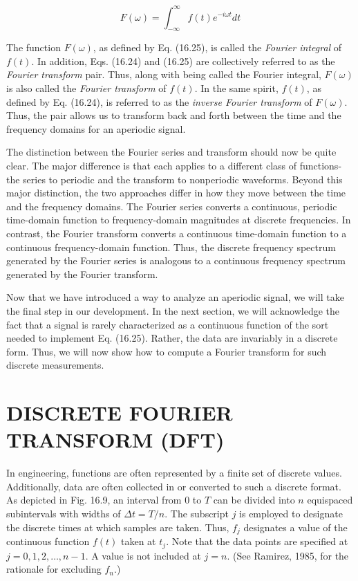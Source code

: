 \documentclass[../main.tex]{subfiles}
\begin{document}
\begin{equation}
	\tag{16.25}
	F(\omega) = \int ^ \infty _ {-\infty} f(t)e ^ {-i \omega t} dt
\end{equation}

The function $F(\omega)$, as defined by Eq. (16.25), is called the \textit{Fourier integral} of $f(t)$. In
addition, Eqs. (16.24) and (16.25) are collectively referred to as the \textit{Fourier transform}
pair. Thus, along with being called the Fourier integral, $F(\omega)$ is also called the \textit{Fourier
transform} of $f(t)$. In the same spirit, $f(t)$, as defined by Eq. (16.24), is referred to as the
\textit{inverse Fourier transform} of $F(\omega)$. Thus, the pair allows us to transform back and forth
between the time and the frequency domains for an aperiodic signal.

The distinction between the Fourier series and transform should now be quite clear.
The major difference is that each applies to a different class of functions-the series to periodic and the transform to nonperiodic waveforms. Beyond this major distinction, the two
approaches differ in how they move between the time and the frequency domains. The
Fourier series converts a continuous, periodic time-domain function to frequency-domain
magnitudes at discrete frequencies. In contrast, the Fourier transform converts a continuous time-domain function to a continuous frequency-domain function. Thus, the discrete
frequency spectrum generated by the Fourier series is analogous to a continuous frequency
spectrum generated by the Fourier transform.

Now that we have introduced a way to analyze an aperiodic signal, we will take the
final step in our development. In the next section, we will acknowledge the fact that a
signal is rarely characterized as a continuous function of the sort needed to implement
Eq. (16.25). Rather, the data are invariably in a discrete form. Thus, we will now show how
to compute a Fourier transform for such discrete measurements.

\label{cha:cha_P_16_5} %
\section{DISCRETE FOURIER TRANSFORM (DFT)}

\noindent In engineering, functions are often represented by a finite set of discrete values. Additionally, data are often collected in or converted to such a discrete format. As depicted in
Fig. 16.9, an interval from 0 to $T$ can be divided into $n$ equispaced subintervals with widths
of $\Delta t = T /n$. The subscript $j$ is employed to designate the discrete times at which samples
are taken. Thus, $f_j$ designates a value of the continuous function $f(t)$ taken at $t_j$. Note that the
data points are specified at $j = 0, 1, 2, \dots , n - 1$. A value is not included at $j = n$. (See
Ramirez, 1985, for the rationale for excluding $f_n$.)
\end{document}
